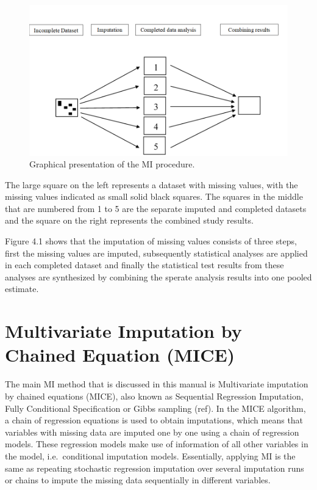 \documentclass[]{book}
\begin{document}
\begin{figure}

{\centering \includegraphics[width=0.9\linewidth]{images/fig4.1} 

}

\caption{Graphical presentation of the MI procedure. }\label{fig:fig41}
\end{figure}

The large square on the left represents a dataset with missing values,
with the missing values indicated as small solid black squares. The
squares in the middle that are numbered from 1 to 5 are the separate
imputed and completed datasets and the square on the right represents
the combined study results.

Figure 4.1 shows that the imputation of missing values consists of three
steps, first the missing values are imputed, subsequently statistical
analyses are applied in each completed dataset and finally the
statistical test results from these analyses are synthesized by
combining the sperate analysis results into one pooled estimate.

\section{Multivariate Imputation by Chained Equation
(MICE)}\label{multivariate-imputation-by-chained-equation-mice}

The main MI method that is discussed in this manual is Multivariate
imputation by chained equations (MICE), also known as Sequential
Regression Imputation, Fully Conditional Specification or Gibbs sampling
(ref). In the MICE algorithm, a chain of regression equations is used to
obtain imputations, which means that variables with missing data are
imputed one by one using a chain of regression models. These regression
models make use of information of all other variables in the model,
i.e.~conditional imputation models. Essentially, applying MI is the same
as repeating stochastic regression imputation over several imputation
runs or chains to impute the missing data sequentially in different
variables.
\end{document}
